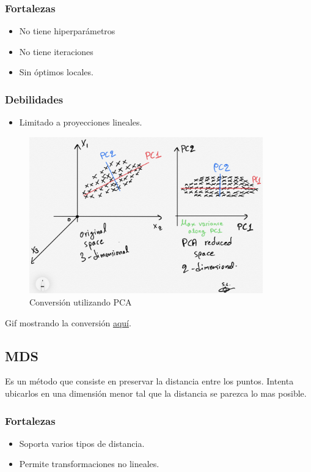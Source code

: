\documentclass[titlepage,a4paper]{article}
\begin{document}
\subsubsection*{Fortalezas}
\begin{itemize}
    \item No tiene hiperparámetros
    \item No tiene iteraciones
    \item Sin óptimos locales.
\end{itemize}

\subsubsection*{Debilidades}
\begin{itemize}
    \item Limitado a proyecciones lineales.
\end{itemize}

\begin{figure}[!htb]
    \centering
    \includegraphics[width=0.9\textwidth]{imagenesResumen/PCA.jpeg}
    \caption{Conversión utilizando PCA}
\end{figure}

Gif mostrando la conversión \href{https://miro.medium.com/max/1556/1*T7CqlFV5aRm6MxO5nJt7Qw.gif}{aquí}.

\subsection{MDS}

Es un método que consiste en preservar la distancia entre los puntos. Intenta ubicarlos en una dimensión menor tal que la distancia se parezca lo mas posible.

\subsubsection*{Fortalezas}
\begin{itemize}
    \item Soporta varios tipos de distancia.
    \item Permite transformaciones no lineales.
\end{itemize}
\end{document}
